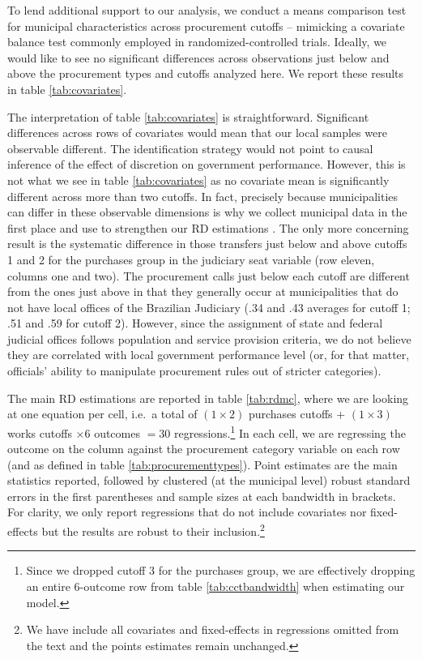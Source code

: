 \documentclass[11pt]{article}
\begin{document}
To lend additional support to our analysis, we conduct a means comparison test for municipal characteristics across procurement cutoffs -- mimicking a covariate balance test commonly employed in randomized-controlled trials. Ideally, we would like to see no significant differences across observations just below and above the procurement types and cutoffs analyzed here. We report these results in table \ref{tab:covariates}.



The interpretation of table \ref{tab:covariates} is straightforward. Significant differences across rows of covariates would mean that our local samples were observable different. The identification strategy would not point to causal inference of the effect of discretion on government performance. However, this is not what we see in table \ref{tab:covariates} as no covariate mean is significantly different across more than two cutoffs. In fact, precisely because municipalities can differ in these observable dimensions is why we collect municipal data in the first place and use to strengthen our RD estimations \citep{CalonicoRegressionDiscontinuityDesigns2018}. The only more concerning result is the systematic difference in those transfers just below and above cutoffs 1 and 2 for the purchases group in the judiciary seat variable (row eleven, columns one and two). The procurement calls just below each cutoff are different from the ones just above in that they generally occur at municipalities that do not have local offices of the Brazilian Judiciary (.34 and .43 averages for cutoff 1; .51 and .59 for cutoff 2). However, since the assignment of state and federal judicial offices follows population and service provision criteria, we do not believe they are correlated with local government performance level (or, for that matter, officials' ability to manipulate procurement rules out of stricter categories).

The main RD estimations are reported in table \ref{tab:rdmc}, where we are looking at one equation per cell, i.e.~a total of $(1 \times 2)$ purchases cutoffs + $(1 \times 3)$ works cutoffs $\times 6$ outcomes $= 30$ regressions.\footnote{Since we dropped cutoff 3 for the purchases group, we are effectively dropping an entire 6-outcome row from table \ref{tab:cctbandwidth} when estimating our model.} In each cell, we are regressing the outcome on the column against the procurement category variable on each row (and as defined in table \ref{tab:procurementtypes}). Point estimates are the main statistics reported, followed by clustered (at the municipal level) robust standard errors in the first parentheses and sample sizes at each bandwidth in brackets. For clarity, we only report regressions that do not include covariates nor fixed-effects but the results are robust to their inclusion.\footnote{We have include all covariates and fixed-effects in regressions omitted from the text and the points estimates remain unchanged.}
\end{document}
